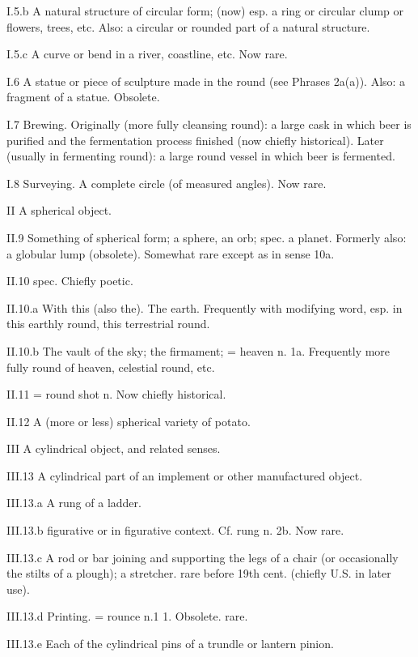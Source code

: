 \begin{compactitem}
			\item[I.5.b] A natural structure of circular form; (now) esp. a ring or circular clump or flowers, trees, etc. Also: a circular or rounded part of a natural structure.
			\item[I.5.c] A curve or bend in a river, coastline, etc. Now rare.
			\item[I.6] A statue or piece of sculpture made in the round (see Phrases 2a(a)). Also: a fragment of a statue. Obsolete.
			\item[I.7] Brewing. Originally (more fully cleansing round): a large cask in which beer is purified and the fermentation process finished (now chiefly historical). Later (usually in fermenting round): a large round vessel in which beer is fermented.
			\item[I.8] Surveying. A complete circle (of measured angles). Now rare.
			\item[II] A spherical object.
			\item[II.9] Something of spherical form; a sphere, an orb; spec. a planet. Formerly also: a globular lump (obsolete). Somewhat rare except as in sense 10a.
			\item[II.10] spec. Chiefly poetic.
			\item[II.10.a] With this (also the). The earth. Frequently with modifying word, esp. in this earthly round, this terrestrial round.
			\item[II.10.b] The vault of the sky; the firmament; = heaven n. 1a. Frequently more fully round of heaven, celestial round, etc.
			\item[II.11] = round shot n.   Now chiefly historical.
			\item[II.12] A (more or less) spherical variety of potato.
			\item[III] A cylindrical object, and related senses.
			\item[III.13] A cylindrical part of an implement or other manufactured object.
			\item[III.13.a] A rung of a ladder.
			\item[III.13.b] figurative or in figurative context. Cf. rung n. 2b. Now rare.
			\item[III.13.c] A rod or bar joining and supporting the legs of a chair (or occasionally the stilts of a plough); a stretcher. rare before 19th cent. (chiefly U.S. in later use).
			\item[III.13.d] Printing. = rounce n.1 1. Obsolete. rare.
			\item[III.13.e] Each of the cylindrical pins of a trundle or lantern pinion.

\end{compactitem}
